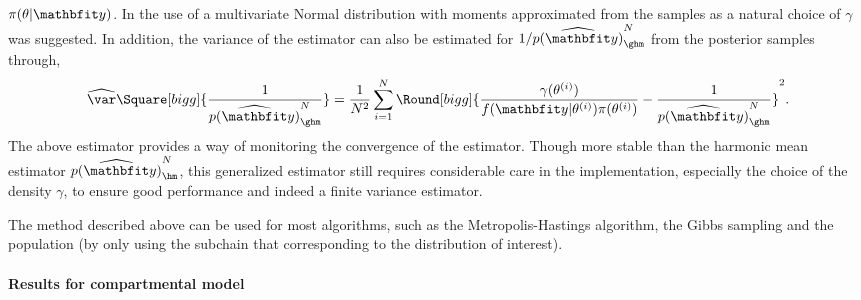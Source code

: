 $\pi(\theta|\data)$. In \cite{Gelfand:1994ux} the use of a multivariate Normal
distribution with moments approximated from the samples as a natural choice of
$\gamma$ was suggested. In addition, the variance of the estimator can also be
estimated for $1/\widehat{p(\data)}_{\ghm}^N$ from the posterior samples
through,
\begin{equation}
  \widehat{\var}\Square[bigg]{\frac{1}{\widehat{p(\data)}_{\ghm}^N}} =
  \frac{1}{N^2}\sum_{i=1}^N \Round[bigg]{
    \frac{\gamma(\theta^{(i)})}{f(\data|\theta^{(i)})\pi(\theta^{(i)})}
    - \frac{1}{\widehat{p(\data)}_{\ghm}^N}}^2.
\end{equation}
The above estimator provides a way of monitoring the convergence of the
estimator. Though more stable than the harmonic mean estimator
$\widehat{p(\data)}_{\hm}^N$, this generalized estimator still requires
considerable care in the implementation, especially the choice of the density
$\gamma$, to ensure good performance and indeed a finite variance estimator.

The method described above can be used for most \mcmc algorithms, such as the
Metropolis-Hastings algorithm, the Gibbs sampling and the population \mcmc (by
only using the subchain that corresponding to the distribution of interest).

\paragraph{Results for \pet compartmental model}


